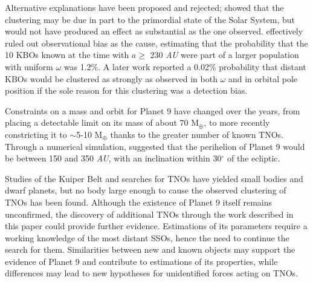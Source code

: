 \documentclass[twocolumn]{aastex62}
\begin{document}
Alternative explanations have been proposed and rejected; \cite{khain18} showed that the clustering may be due in part to the primordial state of the Solar System, but would not have produced an effect as substantial as the one observed.  \cite{brown17} effectively ruled out observational bias as the cause, estimating that the probability that the 10 KBOs known at the time with $a\geq$ 230 \textit{AU} were part of a larger population with uniform $\omega$ was 1.2\%.  A later work \citep{brown19} reported a 0.02\% probability that distant KBOs would be clustered as strongly as observed in both $\omega$ and in orbital pole position if the sole reason for this clustering was a detection bias. 

Constraints on a mass and orbit for Planet 9 have changed over the years, from \cite{Hogg91} placing a detectable limit on its mass of about 70 M$_{\oplus}$, to \cite{batygin19} more recently constricting it to $\sim$5-10 M$_{\oplus}$ thanks to the greater number of known TNOs.  Through a numerical simulation, \cite{brown16} suggested that the perihelion of Planet 9 would be between 150 and 350 \textit{AU}, with an inclination within 30$^{\circ}$ of the ecliptic.  

Studies of the Kuiper Belt and searches for TNOs  have yielded small bodies and dwarf planets, but no body large enough to cause the observed clustering of TNOs has been found. Although the existence of Planet 9 itself remains unconfirmed, the discovery of additional TNOs through the work described in this paper could provide further evidence.  Estimations of its parameters require a working knowledge of the most distant SSOs, hence the need to continue the search for them.  Similarities between new and known objects may support the evidence of Planet 9 and contribute to estimations of its properties, while differences may lead to new hypotheses for unidentified forces acting on TNOs.  

\end{document}
